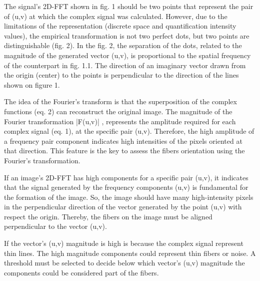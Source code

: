 \documentclass[12pt,a4paper]{article}
\begin{document}
The signal's 2D-FFT shown in fig. 1 should be two points that represent the pair of (u,v) at which the complex signal was calculated. However, due to the limitations of the representation (discrete space and quantification intensity values), the empirical transformation is not two perfect dots, but two points are distinguishable (fig. 2). In the fig. 2, the separation of the dots, related to the magnitude of the generated vector (u,v), is proportional to the spatial frequency of the counterpart in fig. 1.1.  The direction of an imaginary vector drawn from the origin (center) to the points is perpendicular to the direction of the lines shown on figure 1. 

The idea of the Fourier's transform is that the superposition of the complex functions (eq. 2) can reconstruct the original image. The magnitude of the Fourier transformation |F(u,v)| , represents  the amplitude required for each complex signal (eq. 1), at the specific pair (u,v). Therefore, the high amplitude of a frequency pair component indicates high intensities of the pixels oriented at that direction. This feature is the key to assess the fibers orientation using the Fourier’s transformation. 

If an image's 2D-FFT has high components for a specific pair (u,v),  it indicates that the signal generated by the frequency components (u,v)  is fundamental for the formation of the image. So, the image should have many high-intensity pixels in the perpendicular direction of the vector generated by the point (u,v) with respect the origin. Thereby, the fibers on the image must be aligned perpendicular to the vector (u,v).

If the vector's (u,v) magnitude is high is because the complex signal represent thin lines. The high magnitude components could represent thin fibers or noise. A threshold must be selected to decide below which vector's (u,v) magnitude the components could be considered part of the fibers.
\end{document}
